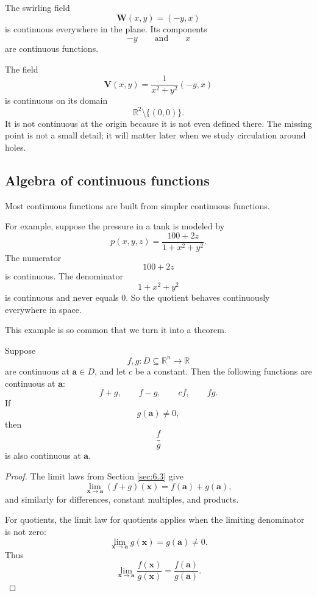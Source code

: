 \begin{example}
The swirling field
\[
    \mathbf W(x,y)=(-y,x)
\]
is continuous everywhere in the plane.  Its components
\[
    -y
    \qquad\text{and}\qquad
    x
\]
are continuous functions.

The field
\[
    \mathbf V(x,y)=\frac{1}{x^2+y^2}(-y,x)
\]
is continuous on its domain
\[
    \mathbb R^2\setminus\{(0,0)\}.
\]
It is not continuous at the origin because it is not even defined there.  The missing
point is not a small detail; it will matter later when we study circulation around holes.
\end{example}

\subsection{Algebra of continuous functions}

Most continuous functions are built from simpler continuous functions.

For example, suppose the pressure in a tank is modeled by
\[
    p(x,y,z)=\frac{100+2z}{1+x^2+y^2}.
\]
The numerator
\[
    100+2z
\]
is continuous.  The denominator
\[
    1+x^2+y^2
\]
is continuous and never equals \(0\).  So the quotient behaves continuously everywhere
in space.

This example is so common that we turn it into a theorem.

\begin{theorem}
Suppose
\[
    f,g:D\subseteq\mathbb R^n\to\mathbb R
\]
are continuous at \(\mathbf a\in D\), and let \(c\) be a constant.  Then the following
functions are continuous at \(\mathbf a\):
\[
    f+g,\qquad f-g,\qquad cf,\qquad fg.
\]
If
\[
    g(\mathbf a)\ne0,
\]
then
\[
    \frac{f}{g}
\]
is also continuous at \(\mathbf a\).
\end{theorem}

\begin{proof}
The limit laws from Section \ref{sec:6.3} give
\[
    \lim_{\mathbf x\to\mathbf a}(f+g)(\mathbf x)
    =
    f(\mathbf a)+g(\mathbf a),
\]
and similarly for differences, constant multiples, and products.

For quotients, the limit law for quotients applies when the limiting denominator is not
zero:
\[
    \lim_{\mathbf x\to\mathbf a}g(\mathbf x)=g(\mathbf a)\ne0.
\]
Thus
\[
    \lim_{\mathbf x\to\mathbf a}\frac{f(\mathbf x)}{g(\mathbf x)}
    =
    \frac{f(\mathbf a)}{g(\mathbf a)}.
\]
\end{proof}


